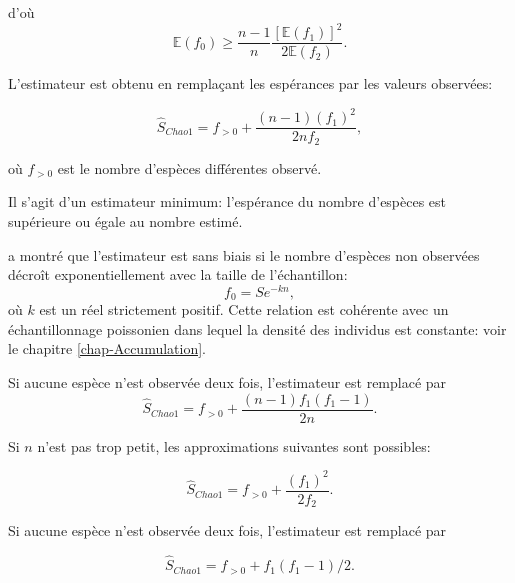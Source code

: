 \documentclass[
  11pt,
  american,
  a4paper,
  extrafontsizes,onecolumn,openright
  ]{memoir}
\begin{document}
d'où
\begin{equation}
  \label{eq:Esn0}
  {\mathbb E}(f_{0}) 
  \ge \frac{n - 1}{n}\frac{\left[ {\mathbb E}(f_{1}) \right]^2}{2 {\mathbb E}(f_{2})}.
\end{equation}

L'estimateur est obtenu en remplaçant les espérances par les valeurs observées:

\begin{equation}
  \label{eq:Chao1}
  {\hat{S}}_\mathit{Chao1} 
   = f_{>0} + \frac{\left(n - 1 \right){\left( f_{1} \right)}^2}{2n {f_{2}}},
\end{equation}

où \(f_{>0}\) est le nombre d'espèces différentes observé.

Il s'agit d'un estimateur minimum: l'espérance du nombre d'espèces est supérieure ou égale au nombre estimé.

\textcite{Beguinot2014} a montré que l'estimateur est sans biais si le nombre d'espèces non observées décroît exponentiellement avec la taille de l'échantillon:
\begin{equation}
  \label{eq:BiaisChao}
  f_{0} = S e^{-kn},
\end{equation}
où \(k\) est un réel strictement positif.
Cette relation est cohérente avec un échantillonnage poissonien dans lequel la densité des individus est constante: voir le chapitre \ref{chap-Accumulation}.

Si aucune espèce n'est observée deux fois, l'estimateur est remplacé par
\begin{equation}
  \label{eq:Chao1sansf2}
  {\hat{S}}_\mathit{Chao1} = f_{>0} + \frac{\left( n - 1 \right){f_{1}}\left( f_{1} - 1 \right)}{2n}.
\end{equation}

Si \(n\) n'est pas trop petit, les approximations suivantes sont possibles:

\begin{equation}
  \label{eq:Chao1sansn}
  \hat{S}_\mathit{Chao1}
   = {f_{>0}} + \frac{{\left( f_{1} \right)}^2}{2f_{2}}.
\end{equation}

Si aucune espèce n'est observée deux fois, l'estimateur est remplacé \autocite{Chao2004} par

\begin{equation}
  \label{eq:Chao1sansnf2}
  {\hat{S}}_\mathit{Chao1} 
  = {f_{>0}} + {f_{1}\left( f_{1} - 1 \right)} / {2}.
\end{equation}
\end{document}
